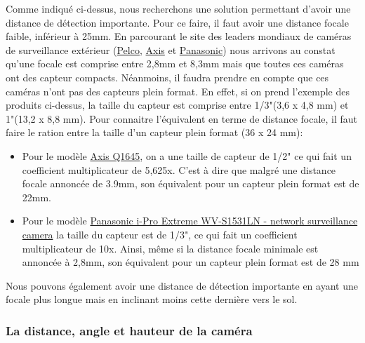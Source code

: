 Comme indiqué ci-dessus, nous recherchons une solution permettant d'avoir une distance de détection importante.
Pour ce faire, il faut avoir une distance focale faible, inférieur à 25mm.
En parcourant le site des leaders mondiaux de caméras de surveillance extérieur 
(\href{https://media.pelco.com/wp-content/uploads/2020/11/10145554/SC-2042-Quick-Reference-Guide-update-QRG-April-2020.pdf}{Pelco}, 
\href{https://www.axis.com/fr-fr/products/axis-q16-series}{Axis} et
\href{https://business.panasonic.fr/solutions-de-securite/cam%C3%A9ra-bullet-ext%C3%A9rieure-4k-plateforme-ouverte-intelligence-artificielle/wv-x1571ln}{Panasonic})
nous arrivons au constat qu'une focale est comprise entre 2,8mm et 8,3mm mais que toutes ces caméras ont des capteur compacts.
Néanmoins, il faudra prendre en compte que ces caméras n'ont pas des capteurs plein format. En effet, si on prend l'exemple des 
produits ci-dessus, la taille du capteur est comprise entre 1/3"(3,6 x 4,8 mm) et 1"(13,2 x 8,8 mm). 
Pour connaitre l'équivalent en terme de distance focale, il faut faire le ration entre la taille d'un capteur plein format (36 x 24 mm):
\begin{itemize}
    \item Pour le modèle \href{https://www.axis.com/fr-fr/products/axis-q1645#technical-specifications}{Axis Q1645}, on a une taille de capteur de 1/2"
    ce qui fait un coefficient multiplicateur de 5,625x. C'est à dire que malgré une distance focale annoncée de 3.9mm, son équivalent pour un capteur plein format est de 22mm.
    \item Pour le modèle \href{https://www.cdw.com/product/panasonic-i-pro-extreme-wv-s1531ln-network-surveillance-camera/4546973#PO}{Panasonic i-Pro Extreme WV-S1531LN - network surveillance camera}
    la taille du capteur est de 1/3", ce qui fait un coefficient multiplicateur de 10x. Ainsi, même si la distance focale minimale est annoncée à 2,8mm, son équivalent pour un capteur plein format est de 28 mm
\end{itemize}


Nous pouvons également avoir une distance de détection importante en ayant une focale plus longue mais en inclinant moins cette dernière vers le sol.


\subsubsection{La distance, angle et hauteur de la caméra}
\label{sec:camera_distance}


